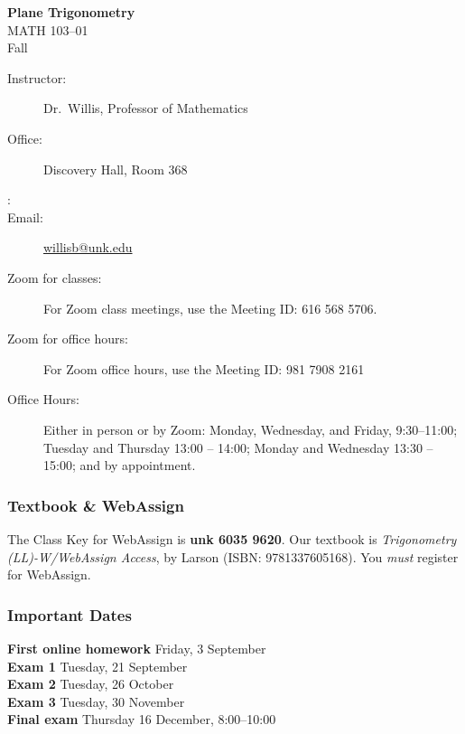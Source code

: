 \documentclass[12pt]{article}
\newcounter{ex}\setcounter{ex}{0}
\newenvironment{mypar}[2]
  {\begin{list}{}%
    {\setlength\leftmargin{#1}
    \setlength\rightmargin{#2}}
    \item[]}
  {\end{list}}
\newcommand{\term}{Fall }
\newcommand{\coursename}{Plane Trigonometry}
\newcommand{\coursenumber}{MATH 103}
\newcommand{\sectionnumber}{01}
\begin{document}
\large
\begin{center}
    \textbf{\coursename}  \\
    {\coursenumber--\sectionnumber} \\
     {\term \the\year} \\
\end{center}

\vskip0.25in
\normalsize


\begin{center}
\begin{description}
    \item[Instructor:] Dr.\  Willis, Professor of Mathematics
    \item[Office:]  Discovery Hall, Room 368
    \item[\phone:]  
    \item[Email:] \href{mailto:willisb@unk.edu}{willisb@unk.edu}
    \item[Zoom for classes:] For Zoom class meetings, use the Meeting ID: 616 568 5706. 
    \item[Zoom for office hours:] For Zoom office hours, use the Meeting ID: 981 7908 2161 
    \item[Office Hours:] Either in person or by Zoom: Monday, Wednesday, and  Friday, \mbox{9:30--11:00}; Tuesday and Thursday 13:00 -- 14:00; Monday and Wednesday 13:30 -- 15:00;  and by appointment.
  \end{description}
\end{center}

\subsubsection*{Textbook \& WebAssign}

The Class Key for WebAssign is \textbf{unk 6035 9620}. Our textbook is
\emph{Trigonometry (LL)-W/WebAssign Access}, by Larson (ISBN: 9781337605168).
You \emph{must} register for WebAssign.

\subsubsection*{Important Dates}

\begin{mypar}{0.25in}{0.25in}
    \textbf{First online homework} \dotfill Friday, 3 September \\
    \textbf{Exam 1} \dotfill Tuesday, 21 September \\
    \textbf{Exam 2} \dotfill Tuesday, 26 October \\
    \textbf{Exam 3} \dotfill Tuesday, 30 November \\
     \textbf{Final exam} \dotfill Thursday 16 December, 8:00--10:00
\end{mypar}
\end{document}
